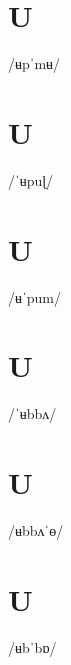 \documentclass[10pt,a4paper,twoside]{book}
\begin{document}
\section*{U}

\begin{multicols}{3}
 {/ʉpˈmʉ/} {}
\end{multicols}

\section*{U}

\begin{multicols}{3}
 {/ˈʉpuɭ/} {}
\end{multicols}

\section*{U}

\begin{multicols}{3}
 {/ʉˈpum/} {}
\end{multicols}

\section*{U}

\begin{multicols}{3}
 {/ˈʉbbʌ/} {}
\end{multicols}

\section*{U}

\begin{multicols}{3}
 {/ʉbbʌˈɵ/} {}
\end{multicols}

\section*{U}

\begin{multicols}{3}
 {/ʉbˈbɒ/} {}
\end{multicols}
\end{document}
